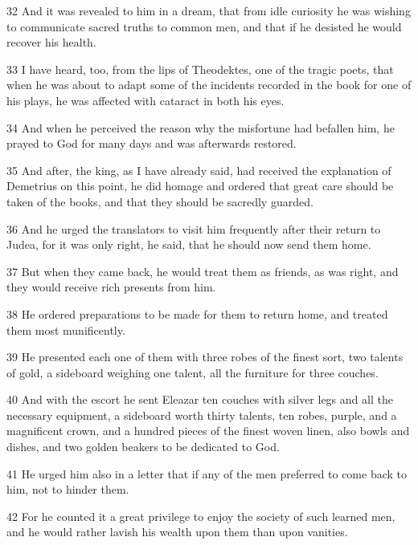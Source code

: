 \par 32 And it was revealed to him in a dream, that from idle curiosity he was wishing to communicate sacred truths to common men, and that if he desisted he would recover his health.

\par 33 I have heard, too, from the lips of Theodektes, one of the tragic poets, that when he was about to adapt some of the incidents recorded in the book for one of his plays, he was affected with cataract in both his eyes.

\par 34 And when he perceived the reason why the misfortune had befallen him, he prayed to God for many days and was afterwards restored.

\par 35 And after, the king, as I have already said, had received the explanation of Demetrius on this point, he did homage and ordered that great care should be taken of the books, and that they should be sacredly guarded.

\par 36 And he urged the translators to visit him frequently after their return to Judea, for it was only right, he said, that he should now send them home.

\par 37 But when they came back, he would treat them as friends, as was right, and they would receive rich presents from him.

\par 38 He ordered preparations to be made for them to return home, and treated them most munificently.

\par 39 He presented each one of them with three robes of the finest sort, two talents of gold, a sideboard weighing one talent, all the furniture for three couches.

\par 40 And with the escort he sent Eleazar ten couches with silver legs and all the necessary equipment, a sideboard worth thirty talents, ten robes, purple, and a magnificent crown, and a hundred pieces of the finest woven linen, also bowls and dishes, and two golden beakers to be dedicated to God.

\par 41 He urged him also in a letter that if any of the men preferred to come back to him, not to hinder them.

\par 42 For he counted it a great privilege to enjoy the society of such learned men, and he would rather lavish his wealth upon them than upon vanities.

